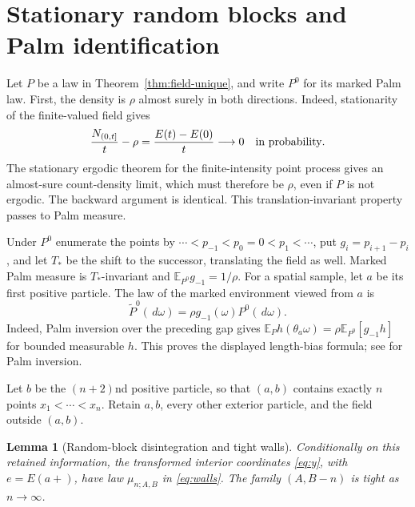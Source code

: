 \documentclass[11pt,reqno]{amsart}
\newtheorem{lemma}[theorem]{Lemma}
\theoremstyle{definition}
\theoremstyle{remark}
\newcommand{\E}{\mathbb E}
\newcommand{\1}{\mathbf 1}
\newcommand{\dd}{\,d}
\numberwithin{equation}{section}
\begin{document}
\section{Stationary random blocks and Palm identification}\label{sec:palm}

Let $P$ be a law in Theorem~\ref{thm:field-unique}, and write $P^0$ for its
marked Palm law. First, the density is $\rho$ almost surely in both
directions. Indeed, stationarity of the finite-valued field gives
\[
 \frac{N_{(0,t]}}t-\rho=\frac{E(t)-E(0)}t\longrightarrow0
 \quad\hbox{in probability}.
\]
The stationary ergodic theorem for the finite-intensity point process
gives an almost-sure count-density limit, which must therefore be
$\rho$, even if $P$ is not ergodic. The backward argument is identical.
This translation-invariant property passes to Palm measure.

Under $P^0$ enumerate the points by
$\cdots<p_{-1}<p_0=0<p_1<\cdots$, put $g_i=p_{i+1}-p_i$, and let
$T_*$ be the shift to the successor, translating the field as well.
Marked Palm measure is $T_*$-invariant and $\E_{P^0}g_{-1}=1/\rho$.
For a spatial sample, let $a$ be its first positive particle.
The law of the marked environment viewed from $a$ is
\begin{equation}\label{eq:bias}
 \widetilde P^0(\dd\omega)=\rho g_{-1}(\omega)P^0(\dd\omega).
\end{equation}
Indeed, Palm inversion over the preceding gap gives
$\E_P h(\theta_a\omega)=\rho\E_{P^0}[g_{-1}h]$ for bounded
measurable $h$. This proves the displayed length-bias formula; see
\cite[Chapter~9]{LastPenrose} for Palm inversion.

Let $b$ be the $(n+2)$nd positive particle, so that $(a,b)$ contains
exactly $n$ points $x_1<\cdots<x_n$. Retain $a,b$, every other exterior
particle, and the field outside $(a,b)$.

\begin{lemma}[Random-block disintegration and tight walls]\label{lem:block}
Conditionally on this retained information, the transformed interior
coordinates \eqref{eq:y}, with $e=E(a+)$, have law $\mu_{n;A,B}$ in
\eqref{eq:walls}. The family $(A,B-n)$ is tight as $n\to\infty$.
\end{lemma}
\end{document}
